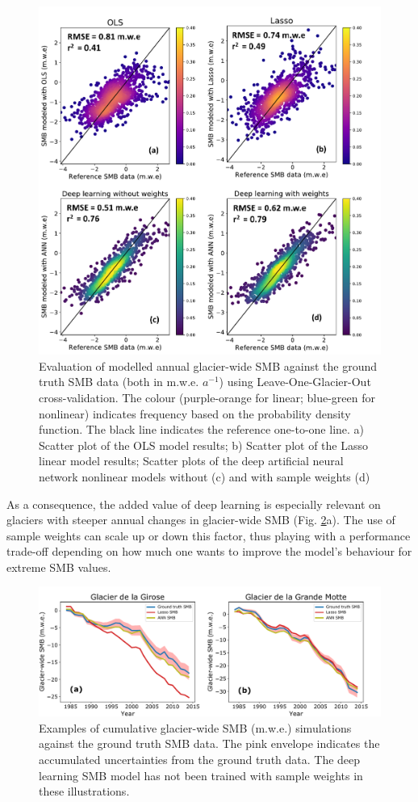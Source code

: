 \begin{figure}[t]
\centering
\includegraphics[width=12cm]{Figures/methods/Figure_6.pdf}
\caption{Evaluation of modelled annual glacier-wide SMB against the ground truth SMB data (both in m.w.e. $ a^{-1}$) using Leave-One-Glacier-Out cross-validation. The colour (purple-orange for linear; blue-green for nonlinear) indicates frequency based on the probability density function. The black line indicates the reference one-to-one line. a) Scatter plot of the OLS model results; b) Scatter plot of the Lasso linear model results; Scatter plots of the deep artificial neural network nonlinear models without (c) and with sample weights (d)}
\label{methods:fig6}
\end{figure}

As a consequence, the added value of deep learning is especially relevant on glaciers with steeper annual changes in glacier-wide SMB (Fig. \ref{methods:fig7}a). The use of sample weights can scale up or down this factor, thus playing with a performance trade-off depending on how much one wants to improve the model’s behaviour for extreme SMB values. 

\begin{figure}[t]
\centering
\includegraphics[width=14cm]{Figures/methods/Figure_7.pdf}
\caption{Examples of cumulative glacier-wide SMB (m.w.e.) simulations against the ground truth SMB data. The pink envelope indicates the accumulated uncertainties from the ground truth data. The deep learning SMB model has not been trained with sample weights in these illustrations.}
\label{methods:fig7}
\end{figure}

